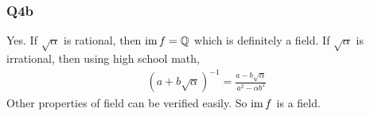 \subsubsection{Q4b}
Yes.
If \(\sqrt{\alpha}\) is rational, then \(\operatorname{im}{f} = \mathbb{Q}\) which is definitely a field.
If \(\sqrt{\alpha}\) is irrational, then using high school math,
\begin{align*}
	(a + b\sqrt{\alpha})^{-1} = \frac{a - b \sqrt{\alpha}}{a^2 - \alpha b^2}
\end{align*}
Other properties of field can be verified easily.
So \(\operatorname{im}{f}\) is a field.